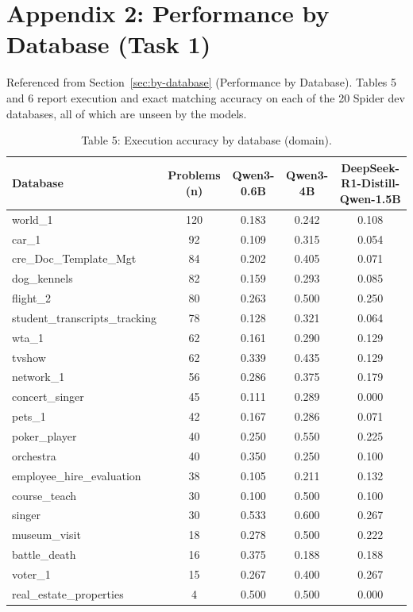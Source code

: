 \documentclass[11pt]{article}
\begin{document}
\section*{Appendix 2: Performance by Database (Task 1)}
\label{sec:appendix2}

Referenced from Section~\ref{sec:by-database} (Performance by Database). Tables 5 and 6 report execution and exact matching accuracy on each of the 20 Spider dev databases, all of which are unseen by the models.

\begin{table}[H]
\centering
\footnotesize
\caption{Table 5: Execution accuracy by database (domain).}
\label{tab:db-execution}
\begin{tabular}{lcccc}
\toprule
Database & Problems (n) & Qwen3-0.6B & Qwen3-4B & DeepSeek-R1-Distill-Qwen-1.5B \\
\midrule
world\_1 & 120 & 0.183 & 0.242 & 0.108 \\
car\_1 & 92 & 0.109 & 0.315 & 0.054 \\
cre\_Doc\_Template\_Mgt & 84 & 0.202 & 0.405 & 0.071 \\
dog\_kennels & 82 & 0.159 & 0.293 & 0.085 \\
flight\_2 & 80 & 0.263 & 0.500 & 0.250 \\
student\_transcripts\_tracking & 78 & 0.128 & 0.321 & 0.064 \\
wta\_1 & 62 & 0.161 & 0.290 & 0.129 \\
tvshow & 62 & 0.339 & 0.435 & 0.129 \\
network\_1 & 56 & 0.286 & 0.375 & 0.179 \\
concert\_singer & 45 & 0.111 & 0.289 & 0.000 \\
pets\_1 & 42 & 0.167 & 0.286 & 0.071 \\
poker\_player & 40 & 0.250 & 0.550 & 0.225 \\
orchestra & 40 & 0.350 & 0.250 & 0.100 \\
employee\_hire\_evaluation & 38 & 0.105 & 0.211 & 0.132 \\
course\_teach & 30 & 0.100 & 0.500 & 0.100 \\
singer & 30 & 0.533 & 0.600 & 0.267 \\
museum\_visit & 18 & 0.278 & 0.500 & 0.222 \\
battle\_death & 16 & 0.375 & 0.188 & 0.188 \\
voter\_1 & 15 & 0.267 & 0.400 & 0.267 \\
real\_estate\_properties & 4 & 0.500 & 0.500 & 0.000 \\
\bottomrule
\end{tabular}
\end{table}
\end{document}
